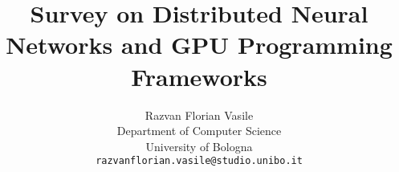 \documentclass[10pt,twocolumn,letterpaper]{article}
\title{Survey on Distributed Neural Networks and GPU Programming Frameworks}
\author{Razvan Florian Vasile\\
Department of Computer Science\\
University of Bologna\\
{\tt\small razvanflorian.vasile@studio.unibo.it}}
\begin{document}
\maketitle
    





%

%

%
 
%


{
    \footnotesize
    
    
}


\end{document}
